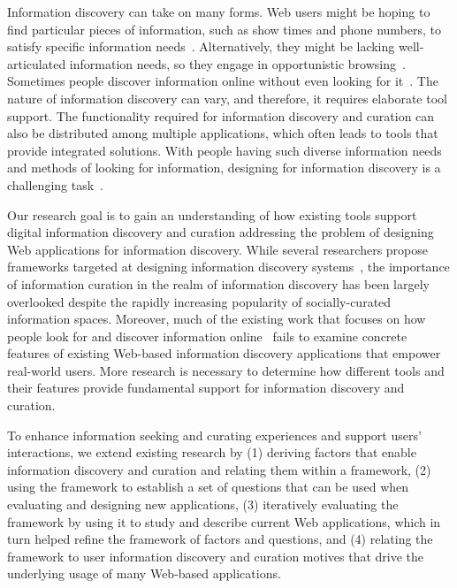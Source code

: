 \documentclass{sigchi}
\begin{document}
Information discovery can take on many forms. Web users might be hoping to find particular pieces of information, such as show times and phone numbers, to satisfy specific information needs~\cite{proper1999information}. Alternatively, they might be lacking well-articulated information needs, so they engage in opportunistic browsing~\cite{lindley2012s}. Sometimes people discover information online without even looking for it~\cite{bates1986exploratory}. The nature of information discovery can vary, and therefore, it requires elaborate tool support. The functionality required for information discovery and curation can also be distributed among multiple applications, which often leads to tools that provide integrated solutions. With people having such diverse information needs and methods of looking for information, designing for information discovery is a challenging task~\cite{conaway2010designing, marchionini2006exploratory}.

Our research goal is to gain an understanding of how existing tools support digital information discovery and curation addressing the problem of designing Web applications for information discovery. While several researchers propose frameworks targeted at designing information discovery systems~\cite{proper1999information, kerne2004information}, the importance of information curation in the realm of information discovery has been largely overlooked despite the rapidly increasing popularity of socially-curated information spaces. Moreover, much of the existing work that focuses on how people look for and discover information online~\cite{bates1986exploratory, choo2000information, ellis1989behavioural, kellar2006goal, lindley2012s, morrison2001taxonomic, sellen2002knowledge} fails to examine concrete features of existing Web-based information discovery applications that empower real-world users. More research is necessary to determine how different tools and their features provide fundamental support for information discovery and curation.

To enhance information seeking and curating experiences and support users' interactions, we extend existing research by (1) deriving factors that enable information discovery and curation and relating them within a framework, (2) using the framework to establish a set of questions that can be used when evaluating and designing new applications, (3) iteratively evaluating the framework by using it to study and describe current Web applications, which in turn helped refine the framework of factors and questions, and (4) relating the framework to user information discovery and curation motives that drive the underlying usage of many Web-based applications.
\end{document}
